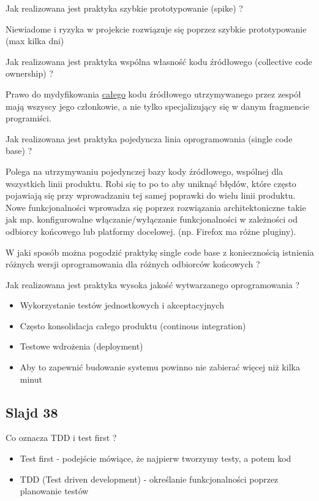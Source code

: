\documentclass[a4paper,15pt]{article}
\newcommand{\question}[2]{
    \begin{tcolorbox}[colback=mRed!5!white,colframe=mRed,title={Kolokwium 2018 #1}]
        #2
    \end{tcolorbox}
}
\begin{document}
\begin{framed}
Jak realizowana jest praktyka szybkie prototypowanie (spike) ?
\end{framed}
Niewiadome i ryzyka w projekcie rozwiązuje się poprzez szybkie prototypowanie (max kilka dni) 

\begin{framed}
Jak realizowana jest praktyka wspólna własność kodu źródłowego (collective code ownership) ?
\end{framed}
Prawo do mydyfikowania \underline{całego} kodu źródłowego utrzymywanego przez zespół mają wszyscy jego członkowie, a nie tylko specjalizujący się w danym fragmencie programiści.

\begin{framed}
Jak realizowana jest praktyka pojedyncza linia oprogramowania (single code base) ?
\end{framed}
Polega na utrzymywaniu pojedynczej bazy kody źródłowego, wspólnej dla wszystkich linii produktu. Robi się to po to aby uniknąć błędów, które często pojawiają się przy wprowadzaniu tej samej poprawki do wielu linii produktu. Nowe funkcjonalności wprowadza się poprzez rozwiązania architektoniczne takie jak mp. konfigurowalne włączanie/wyłączanie funkcjonalności w zależności od odbiorcy końcowego lub platformy docelowej. (np. Firefox ma różne pluginy).

\question{}{
W jaki sposób można pogodzić praktykę single code base z koniecznością istnienia różnych wersji oprogramowania dla różnych odbiorców końcowych ? 
}

\begin{framed}
Jak realizowana jest praktyka  wysoka jakość wytwarzanego oprogramowania ?
\end{framed}
\begin{itemize}
\item Wykorzystanie testów jednostkowych i akceptacyjnych
\item Często konsolidacja całego produktu (continous integration)
\item Testowe wdrożenia (deployment)
\item Aby to zapewnić budowanie systemu powinno nie zabierać więcej niż kilka minut
\end{itemize}

\subsection{Slajd 38}
\begin{framed}
Co oznacza TDD i test first ?
\end{framed}
\begin{itemize}
\item Test first - podejście mówiące, że najpierw tworzymy testy, a potem kod
\item TDD (Test driven development) - określanie funkcjonalności poprzez planowanie testów
\end{itemize}
\end{document}
